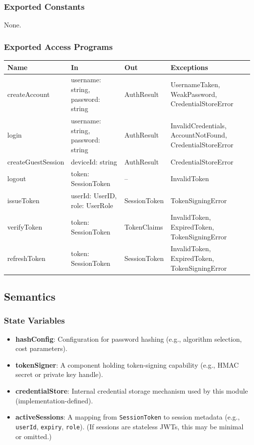 \documentclass[12pt, titlepage]{article}
\begin{document}
\subsubsection{Exported Constants}
None.

\subsubsection{Exported Access Programs}

\begin{center}
\begin{tabular}{p{4.5cm} p{4.5cm} p{3.5cm} p{3.5cm}}
\toprule
\textbf{Name} & \textbf{In} & \textbf{Out} & \textbf{Exceptions} \\
\midrule
createAccount & username: string, password: string & AuthResult & UsernameTaken, WeakPassword, CredentialStoreError \\
login & username: string, password: string & AuthResult & InvalidCredentials, AccountNotFound, CredentialStoreError \\
createGuestSession & deviceId: string & AuthResult & CredentialStoreError \\
logout & token: SessionToken & -- & InvalidToken \\
issueToken & userId: UserID, role: UserRole & SessionToken & TokenSigningError \\
verifyToken & token: SessionToken & TokenClaims & InvalidToken, ExpiredToken, TokenSigningError \\
refreshToken & token: SessionToken & SessionToken & InvalidToken, ExpiredToken, TokenSigningError \\
\bottomrule
\end{tabular}
\end{center}

\subsection{Semantics}

\subsubsection{State Variables}
\begin{itemize}
    \item \textbf{hashConfig}: Configuration for password hashing (e.g., algorithm selection, cost parameters).
    \item \textbf{tokenSigner}: A component holding token-signing capability (e.g., HMAC secret or private key handle).
    \item \textbf{credentialStore}: Internal credential storage mechanism used by this module (implementation-defined).
    \item \textbf{activeSessions}: A mapping from \texttt{SessionToken} to session metadata (e.g., \texttt{userId}, \texttt{expiry}, \texttt{role}). (If sessions are stateless JWTs, this may be minimal or omitted.)
\end{itemize}
\end{document}
